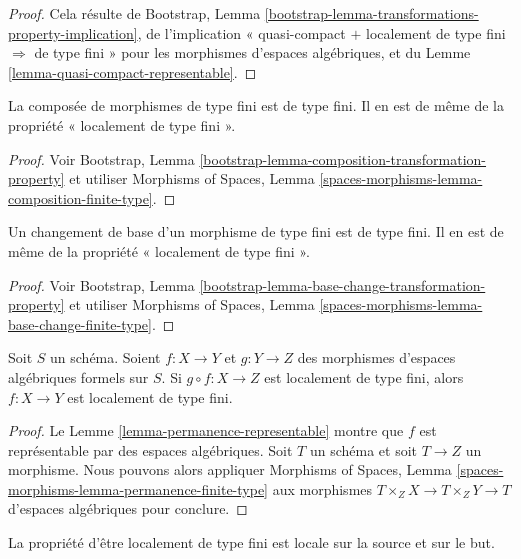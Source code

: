 \begin{proof}
Cela résulte de Bootstrap, Lemma
\ref{bootstrap-lemma-transformations-property-implication},
de l'implication « quasi-compact $+$ localement de type fini
$\Rightarrow$ de type fini » pour les morphismes d'espaces algébriques, et du
Lemme \ref{lemma-quasi-compact-representable}.
\end{proof}

\begin{lemma}
\label{lemma-composition-finite-type}
La composée de morphismes de type fini est de type fini.
Il en est de même de la propriété « localement de type fini ».
\end{lemma}

\begin{proof}
Voir Bootstrap, Lemma \ref{bootstrap-lemma-composition-transformation-property}
et utiliser Morphisms of Spaces, Lemma
\ref{spaces-morphisms-lemma-composition-finite-type}.
\end{proof}

\begin{lemma}
\label{lemma-base-change-finite-type}
Un changement de base d'un morphisme de type fini est de type fini.
Il en est de même de la propriété « localement de type fini ».
\end{lemma}

\begin{proof}
Voir Bootstrap, Lemma \ref{bootstrap-lemma-base-change-transformation-property}
et utiliser Morphisms of Spaces, Lemma
\ref{spaces-morphisms-lemma-base-change-finite-type}.
\end{proof}

\begin{lemma}
\label{lemma-permanence-finite-type}
Soit $S$ un schéma. Soient $f : X \to Y$ et $g : Y \to Z$ des morphismes
d'espaces algébriques formels sur $S$. Si $g \circ f : X \to Z$ est localement de
type fini, alors $f : X \to Y$ est localement de type fini.
\end{lemma}

\begin{proof}
Le Lemme \ref{lemma-permanence-representable} montre que $f$ est
représentable par des espaces algébriques. Soit $T$ un schéma et soit
$T \to Z$ un morphisme. Nous pouvons alors appliquer
Morphisms of Spaces, Lemma \ref{spaces-morphisms-lemma-permanence-finite-type}
aux morphismes
$T \times_Z X \to T \times_Z Y \to T$ d'espaces algébriques pour conclure.
\end{proof}

\noindent
La propriété d'être localement de type fini est locale sur la source et sur le but.

